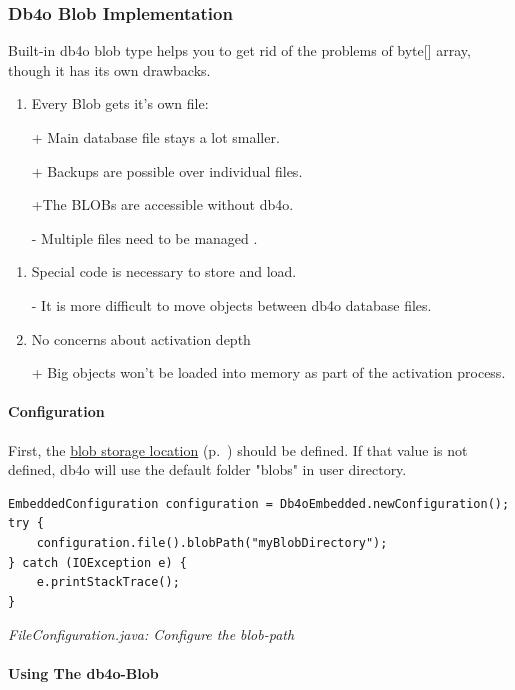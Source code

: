 \subsubsection{Db4o Blob Implementation}
\label{ref:advanced-topics-type-handling-blobs-db4o-blob-implementation}

Built-in db4o blob type helps you to get rid of the problems of byte[] array, though it has its own drawbacks.

\begin{enumerate}
\item Every Blob gets it's own file:

+ Main database file stays a lot smaller.

+ Backups are possible over individual files.

+The BLOBs are accessible without db4o.

- Multiple files need to be managed .
\end{enumerate}

\begin{enumerate}
\item Special code is necessary to store and load.

- It is more difficult to move objects between db4o database files.
\item No concerns about activation depth

+ Big objects won't be loaded into memory as part of the activation process.
\end{enumerate}

\paragraph*{Configuration}

First, the \hyperref[ref:configuration-file-blob-path]{blob storage location} (p.~\pageref{ref:configuration-file-blob-path}) should be defined. If that value is not defined, db4o will use the default folder "blobs" in user directory.

\begin{lstlisting}
EmbeddedConfiguration configuration = Db4oEmbedded.newConfiguration();
try {
    configuration.file().blobPath("myBlobDirectory");
} catch (IOException e) {
    e.printStackTrace();
}
\end{lstlisting}

{\small\itshape FileConfiguration.java: Configure the blob-path\par}
\medskip

\paragraph*{Using The db4o-Blob}

